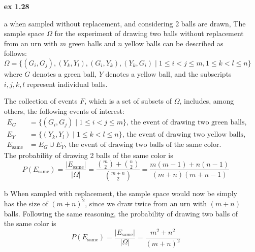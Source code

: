 \documentclass{article}
\begin{document}
\begin{itemize}
      \item[\textbf{ex 1.28}]
      \item[a]when sampled without replacement, and considering 2 balls are drawn, The sample space \( \Omega \) for the experiment of drawing two balls without replacement from an urn with \( m \) green balls and \( n \) yellow balls can be described as follows:
            \begin{equation*}
                  \Omega = \{ (G_i, G_j), (Y_k, Y_l), (G_i, Y_k), (Y_k, G_i) \mid 1 \leq i < j \leq m, 1 \leq k < l \leq n \}
            \end{equation*}
            where \( G \) denotes a green ball, \( Y \) denotes a yellow ball, and the subscripts \( i, j, k, l \) represent individual balls.

            The collection of events \( F \), which is a set of subsets of \( \Omega \), includes, among others, the following events of interest:
            \begin{align*}
                  E_G             & = \{ (G_i, G_j) \mid 1 \leq i < j \leq m \} \text{, the event of drawing two green balls,}  \\
                  E_Y             & = \{ (Y_k, Y_l) \mid 1 \leq k < l \leq n \} \text{, the event of drawing two yellow balls,} \\
                  E_{\text{same}} & = E_G \cup E_Y \text{, the event of drawing two balls of the same color.}
            \end{align*}
            The probability of drawing 2 balls of the same color is
            \begin{equation*}
                  P(E_{\text{same}}) = \frac{|E_{\text{same}}|}{|\Omega|} = \frac{\binom{m}{2} + \binom{n}{2}}{\binom{m+n}{2}} = \frac{m(m-1) + n(n-1)}{(m+n)(m+n-1)}
            \end{equation*}

      \item[b] When sampled with replacement, the sample space would now be simply has the size of $(m+n)^2$, since we draw twice from an urn with $(m+n)$ balls.
            Following the same reasoning, the probability of drawing two balls of the same color is
            \begin{equation*}
                  P(E_{\text{same}}) = \frac{|E_{\text{same}}|}{|\Omega|} = \frac{m^2 + n^2}{(m+n)^2}
            \end{equation*}


\end{itemize}
\end{document}

